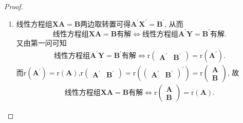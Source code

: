 \documentclass[../../main.tex]{subfiles}
\begin{document}
\begin{proof}
\begin{enumerate}
\item 线性方程组\(\boldsymbol{XA}=\boldsymbol{B}\)两边取转置可得\(\boldsymbol{A}^{\prime}\boldsymbol{X}^{\prime}=\boldsymbol{B}^{\prime}\), 从而
\[
\text{线性方程组}\boldsymbol{XA}=\boldsymbol{B}\text{有解}\Leftrightarrow\text{线性方程组}\boldsymbol{A}^{\prime}\boldsymbol{Y}=\boldsymbol{B}^{\prime}\text{有解}.
\]
又由第一问可知
\begin{align*}
\text{线性方程组}\boldsymbol{A}^{\prime}\boldsymbol{Y}=\boldsymbol{B}^{\prime}\text{有解}\Leftrightarrow \mathrm{r}\begin{pmatrix}\boldsymbol{A}^{\prime}&\boldsymbol{B}^{\prime}\end{pmatrix}=\mathrm{r}(\boldsymbol{A}^{\prime}).
\end{align*}
而\(\mathrm{r}(\boldsymbol{A}^{\prime})=\mathrm{r}(\boldsymbol{A})\),\(\mathrm{r}\begin{pmatrix}\boldsymbol{A}^{\prime}&\boldsymbol{B}^{\prime}\end{pmatrix}=\mathrm{r}\left(\begin{pmatrix}\boldsymbol{A}^{\prime}&\boldsymbol{B}^{\prime}\end{pmatrix}^{\prime}\right)=\mathrm{r}\begin{pmatrix}\boldsymbol{A}\\\boldsymbol{B}\end{pmatrix}\), 故
\begin{align*}
\text{线性方程组}\boldsymbol{XA}=\boldsymbol{B}\text{有解}\Leftrightarrow \mathrm{r}\begin{pmatrix}\boldsymbol{A}\\\boldsymbol{B}\end{pmatrix}=\mathrm{r}(\boldsymbol{A}).
\end{align*} 
\end{enumerate}
\end{proof}
\end{document}
